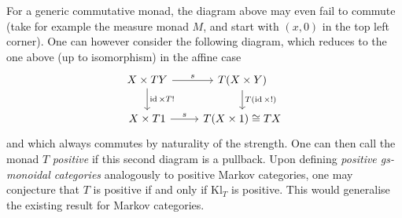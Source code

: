 \documentclass[a4paper,UKenglish,numberwithinsect,cleveref, autoref, thm-restate]{lipics-v2021}
\theoremstyle{plain} %
\theoremstyle{definition} %
\begin{document}
For a generic commutative monad, the diagram above may even fail to commute (take for example the measure monad $M$, and start with $(x,0)$ in the top left corner). One can however consider the following diagram, which reduces to the one above (up to isomorphism) in the affine case
\[
 \begin{tikzcd}
   X \times TY \ar{d}{\id\times T!} \ar{r}{s} & T(X\times Y) \ar{d}{T(\id\times!)} \\
   X \times T1 \ar{r}{s} & T(X\times 1) \cong TX
  \end{tikzcd}
\]
and which always commutes by naturality of the strength.
One can then call the monad $T$ \emph{positive} if this second diagram is a pullback. Upon defining \emph{positive gs-monoidal categories} analogously to positive Markov categories, one may conjecture that $T$ is positive if and only if $\mathrm{Kl}_T$ is positive.
This would generalise the existing result for Markov categories.



\end{document}
